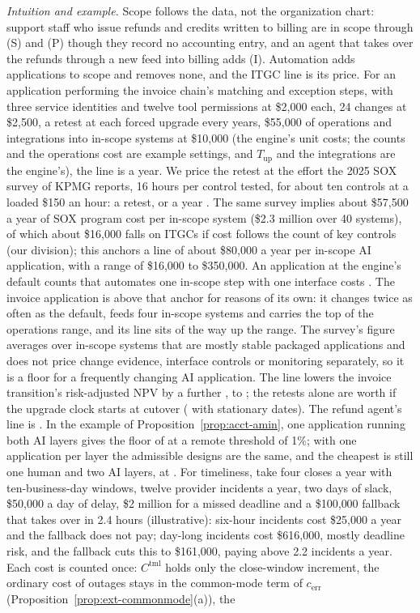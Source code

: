 \noindent\emph{Intuition and example.} Scope follows the data, not the organization chart: support staff who issue refunds and credits written to billing are in scope through (S) and (P) though they record no accounting entry, and an agent that takes over the refunds through a new feed into billing adds (I). Automation adds applications to scope and removes none, and the ITGC line is its price. For an application performing the invoice chain's matching and exception steps, with three service identities and twelve tool permissions at \$2{,}000 each, 24 changes at \$2{,}500, a retest at each forced upgrade every \acctItgcTup{} years, \$55{,}000 of operations and \acctItgcNint{} integrations into in-scope systems at \$10{,}000 (the engine's unit costs; the counts and the operations cost are example settings, and $T_{\mathrm{up}}$ and the integrations are the engine's), the line is \acctItgcInv{} a year. We price the retest at the effort the 2025 SOX survey of KPMG reports, 16 hours per control tested, for about ten controls at a loaded \$150 an hour: \acctItgcVal{} a retest, or \acctItgcUp{} a year \citep{kpmg2025sox}. The same survey implies about \$57{,}500 a year of SOX program cost per in-scope system (\$2.3 million over 40 systems), of which about \$16{,}000 falls on ITGCs if cost follows the count of key controls (our division); this anchors a line of about \$80{,}000 a year per in-scope AI application, with a range of \$16{,}000 to \$350{,}000. An application at the engine's default counts that automates one in-scope step with one interface costs \acctItgcApp. The invoice application is above that anchor for reasons of its own: it changes twice as often as the default, feeds four in-scope systems and carries the top of the operations range, and its line sits \acctItgcPos{} of the way up the range. The survey's figure averages over in-scope systems that are mostly stable packaged applications and does not price change evidence, interface controls or monitoring separately, so it is a floor for a frequently changing AI application. The line lowers the invoice transition's risk-adjusted NPV by a further \acctItgcNPV, to \acctItgcNPVafter; the retests alone are worth \acctItgcPVup{} if the upgrade clock starts at cutover (\acctItgcPVflow{} with stationary dates). The refund agent's line is \acctItgcRef. In the example of Proposition~\ref{prop:acct-amin}, one application running both AI layers gives the floor of \acctAminOneCost{} at a remote threshold of 1\%; with one application per layer the admissible designs are the same, and the cheapest is still one human and two AI layers, at \acctAminSepOne. For timeliness, take four closes a year with ten-business-day windows, twelve provider incidents a year, two days of slack, \$50{,}000 a day of delay, \$2 million for a missed deadline and a \$100{,}000 fallback that takes over in 2.4 hours (illustrative): six-hour incidents cost \$25{,}000 a year and the fallback does not pay; day-long incidents cost \$616{,}000, mostly deadline risk, and the fallback cuts this to \$161{,}000, paying above 2.2 incidents a year. Each cost is counted once: $C^{\mathrm{tml}}$ holds only the close-window increment, the ordinary cost of outages stays in the common-mode term of $c_{\mathrm{err}}$ (Proposition~\ref{prop:ext-commonmode}(a)), the 